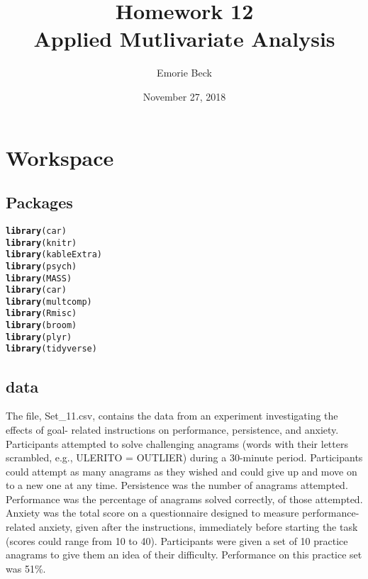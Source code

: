 \documentclass{article}\usepackage[]{graphicx}\usepackage[]{color}
\title{%
Homework 12\\
\large Applied Mutlivariate Analysis}
\date{November 27, 2018}
\author{Emorie Beck}
\makeatletter
\newcommand{\hlstd}[1]{\textcolor[rgb]{0.345,0.345,0.345}{#1}}%
\newcommand{\hlkwd}[1]{\textcolor[rgb]{0.737,0.353,0.396}{\textbf{#1}}}%
\newenvironment{kframe}{%
 \def\at@end@of@kframe{}%
 \ifinner\ifhmode%
  \def\at@end@of@kframe{\end{minipage}}%
  \begin{minipage}{\columnwidth}%
 \fi\fi%
 \def\FrameCommand##1{\hskip\@totalleftmargin \hskip-\fboxsep
 \colorbox{shadecolor}{##1}\hskip-\fboxsep
     \hskip-\linewidth \hskip-\@totalleftmargin \hskip\columnwidth}%
 \MakeFramed {\advance\hsize-\width
   \@totalleftmargin\z@ \linewidth\hsize
   \@setminipage}}%
 {\par\unskip\endMakeFramed%
 \at@end@of@kframe}
\newenvironment{knitrout}{}{} %
\makeatother
\begin{document}
\maketitle

\section{Workspace}
\subsection{Packages}



\begin{knitrout}
\color{fgcolor}\begin{kframe}
\begin{alltt}
\hlkwd{library}\hlstd{(car)}
\hlkwd{library}\hlstd{(knitr)}
\hlkwd{library}\hlstd{(kableExtra)}
\hlkwd{library}\hlstd{(psych)}
\hlkwd{library}\hlstd{(MASS)}
\hlkwd{library}\hlstd{(car)}
\hlkwd{library}\hlstd{(multcomp)}
\hlkwd{library}\hlstd{(Rmisc)}
\hlkwd{library}\hlstd{(broom)}
\hlkwd{library}\hlstd{(plyr)}
\hlkwd{library}\hlstd{(tidyverse)}
\end{alltt}
\end{kframe}
\end{knitrout}



\subsection{data}
The file, Set\_11.csv, contains the data from an experiment investigating the effects of goal- related instructions on performance, persistence, and anxiety. Participants attempted to solve challenging anagrams (words with their letters scrambled, e.g., ULERITO = OUTLIER) during a 30-minute period. Participants could attempt as many anagrams as they wished and could give up and move on to a new one at any time. Persistence was the number of anagrams attempted. Performance was the percentage of anagrams solved correctly, of those attempted. Anxiety was the total score on a questionnaire designed to measure performance-related anxiety, given after the instructions, immediately before starting the task (scores could range from 10 to 40).
Participants were given a set of 10 practice anagrams to give them an idea of their difficulty. Performance on this practice set was 51\%.
\end{document}
